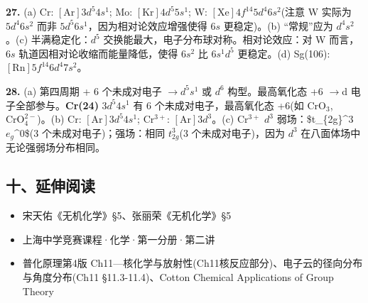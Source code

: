 \documentclass[a4paper,11pt]{ctexart}
\providecommand{\tightlist}{\setlength{\itemsep}{0pt}\setlength{\parskip}{0pt}}
\newcommand{\箭}{\ensuremath{\rightarrow}}
\newcommand{\左箭}{\ensuremath{\leftarrow}}
\newcommand{\上箭}{\ensuremath{\uparrow}}
\newcommand{\下箭}{\ensuremath{\downarrow}}
\newcommand{\衡}{\ensuremath{\rightleftharpoons}}
\newcommand{\双箭}{\ensuremath{\leftrightarrow}}
\newcommand{\约等于}{\ensuremath{\approx}}
\newcommand{\小于等于}{\ensuremath{\leq}}
\newcommand{\大于等于}{\ensuremath{\geq}}
\newcommand{\不等于}{\ensuremath{\neq}}
\newcommand{\西格马}{\ensuremath{\sigma}}
\newcommand{\派}{\ensuremath{\pi}}
\begin{document}
\textbf{27.} (a) Cr: \([\mathrm{Ar}]3d^5 4s^1\); Mo: \([\mathrm{Kr}]4d^5 5s^1\); W: \([\mathrm{Xe}]4f^{14} 5d^4 6s^2\)(注意 W 实际为 \(5d^4 6s^2\) 而非 \(5d^5 6s^1\)，因为相对论效应增强使得 \(6s\) 更稳定)。(b) ``常规''应为 \(d^4 s^2\)。(c) 半满稳定化：\(d^5\) 交换能最大，电子分布球对称。相对论效应：对 W 而言，\(6s\) 轨道因相对论收缩而能量降低，使得 \(6s^2\) 比 \(6s^1 d^5\) 更稳定。(d) Sg(106): \([\mathrm{Rn}]5f^{14} 6d^4 7s^2\)。

\textbf{28.} (a) 第四周期 + 6 个未成对电子 \箭 \(d^5 s^1\) 或 \(d^6\) 构型。最高氧化态 +6 \箭 d 电子全部参与。\textbf{Cr(24)} \(3d^5 4s^1\) 有 6 个未成对电子，最高氧化态 +6(如 \(\mathrm{CrO_3}\), \(\mathrm{CrO_4^{2-}}\))。(b) Cr: \([\mathrm{Ar}]3d^5 4s^1\); \(\mathrm{Cr^{3+}}\): \([\mathrm{Ar}]3d^3\)。(c) \(\mathrm{Cr^{3+}}\) \(d^3\) 弱场：\$t\_\{2g\}\^{}3 \(e_g\)\^{}0\$(3 个未成对电子)；强场：相同 \(t_{2g}^3\)(3 个未成对电子)，因为 \(d^3\) 在八面体场中无论强弱场分布相同。

\subsection{十、延伸阅读}\label{ux5341ux5ef6ux4f38ux9605ux8bfb}

\begin{itemize}
\tightlist
\item
  宋天佑《无机化学》§5、张丽荣《无机化学》§5
\item
  上海中学竞赛课程·化学·第一分册·第二讲
\item
  普化原理第4版 Ch11---核化学与放射性(Ch11核反应部分)、电子云的径向分布与角度分布(Ch11 §11.3-11.4)、Cotton Chemical Applications of Group Theory
\end{itemize}
\end{document}
